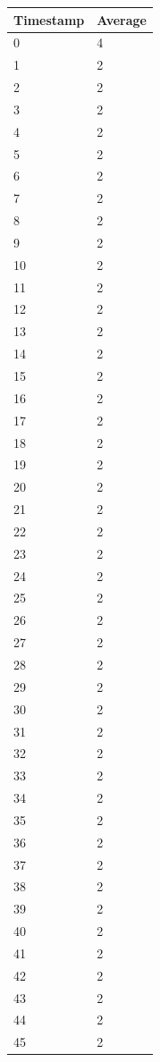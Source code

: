 %
%
\begin{tabular}{|l||l|}
\hline
	\textbf{Timestamp} & \textbf{Average} \\ \hline
	0 & 4 \\ \hline
	1 & 2 \\ \hline
	2 & 2 \\ \hline
	3 & 2 \\ \hline
	4 & 2 \\ \hline
	5 & 2 \\ \hline
	6 & 2 \\ \hline
	7 & 2 \\ \hline
	8 & 2 \\ \hline
	9 & 2 \\ \hline
	10 & 2 \\ \hline
	11 & 2 \\ \hline
	12 & 2 \\ \hline
	13 & 2 \\ \hline
	14 & 2 \\ \hline
	15 & 2 \\ \hline
	16 & 2 \\ \hline
	17 & 2 \\ \hline
	18 & 2 \\ \hline
	19 & 2 \\ \hline
	20 & 2 \\ \hline
	21 & 2 \\ \hline
	22 & 2 \\ \hline
	23 & 2 \\ \hline
	24 & 2 \\ \hline
	25 & 2 \\ \hline
	26 & 2 \\ \hline
	27 & 2 \\ \hline
	28 & 2 \\ \hline
	29 & 2 \\ \hline
	30 & 2 \\ \hline
	31 & 2 \\ \hline
	32 & 2 \\ \hline
	33 & 2 \\ \hline
	34 & 2 \\ \hline
	35 & 2 \\ \hline
	36 & 2 \\ \hline
	37 & 2 \\ \hline
	38 & 2 \\ \hline
	39 & 2 \\ \hline
	40 & 2 \\ \hline
	41 & 2 \\ \hline
	42 & 2 \\ \hline
	43 & 2 \\ \hline
	44 & 2 \\ \hline
	45 & 2 \\ \hline
\end{tabular}
